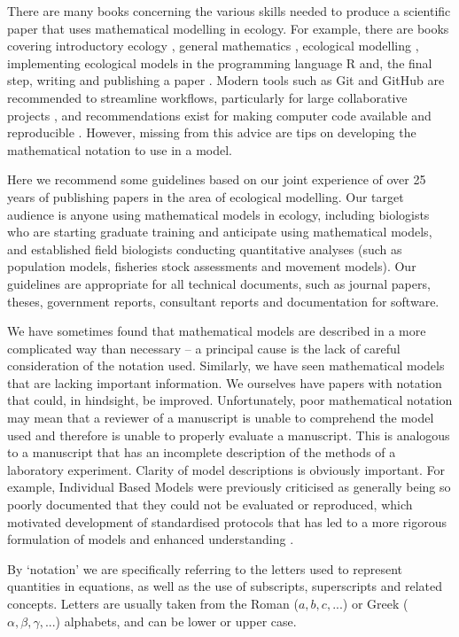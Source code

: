 \documentclass[12pt]{article}
\begin{document}
There are many books concerning the various skills needed to 
produce a scientific paper that uses mathematical modelling in ecology. 
For example, there are books covering introductory ecology \citep{bht86},
general mathematics \citep{krey93}, ecological modelling \citep{hm97},
implementing ecological models in the programming language R \citep{bolk08} 
and, the final step,
writing and publishing a paper \citep{day94}.
Modern tools such as Git and GitHub are recommended to streamline workflows,
particularly for large collaborative projects \citep{lownde17}, and
recommendations exist for making computer code available and reproducible
\citep{barn10, mhw16, wick15}.
However, missing from this
advice are tips on developing the mathematical notation to use in a model.

Here we recommend some guidelines based on our joint experience of over 25 years
of publishing papers in the area of ecological modelling.
Our target audience is anyone using mathematical models in ecology, including
biologists who are starting graduate 
training and anticipate using mathematical models, and established field 
biologists conducting quantitative analyses (such as population models,
fisheries stock assessments and movement models). Our guidelines are appropriate
for all technical documents, such as journal papers, theses,
government reports, consultant reports and documentation for software.

We have sometimes found that mathematical models
are described in a more complicated way than necessary -- a
principal cause is the lack of careful consideration of the notation used.
Similarly, we have seen mathematical models that are lacking important information.
We ourselves have papers with notation that could, in hindsight, be improved.
Unfortunately, poor mathematical notation may mean that a reviewer of a 
manuscript is unable to 
comprehend the model used and therefore 
is unable to properly evaluate a manuscript. This is analogous to a 
manuscript that has an incomplete description of the methods of a
laboratory experiment.
Clarity of model descriptions is obviously important. For example, Individual
Based Models were previously criticised as generally being so poorly documented
that they could not be evaluated or reproduced, which motivated
development of standardised protocols that has led to a more rigorous
formulation of models and enhanced understanding \citep{gbdpgr10}.


By `notation' we are specifically referring to the letters used to represent
quantities in equations, as well as the use of subscripts, superscripts and
related concepts. Letters are usually taken from the Roman ($a, b, c, ...$) or
Greek ($\alpha, \beta, \gamma, ...$) alphabets, and can be lower or upper case.
\end{document}

